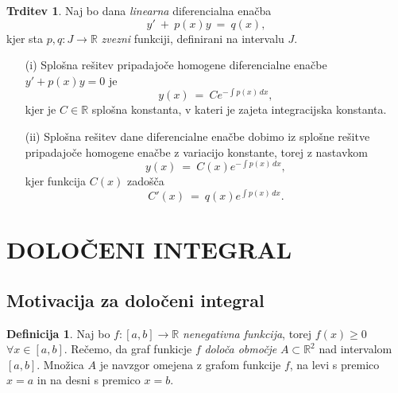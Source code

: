 \documentclass[11pt]{article}
\theoremstyle{definition}
\newtheorem{definicija}{Definicija}[section]
\theoremstyle{definition}
\newtheorem{trditev}{Trditev}[section]
\theoremstyle{definition}
\theoremstyle{theorem}
\begin{document}
\begin{trditev}

Naj bo dana \textit{linearna} diferencialna enačba 
$$y' ~+~ p(x) y ~=~ q(x),$$
kjer sta $p, q: J \rightarrow \mathbb{R}$ \textit{zvezni} funkciji, definirani na intervalu $J$.
\begin{enumerate}

	\item[(i)] Splošna rešitev pripadajoče homogene diferencialne enačbe \\ $y' + p(x) y = 0$ je
	$$y(x) ~=~ Ce^{-\int p(x)\,dx},$$
	kjer je $C \in \mathbb{R}$ splošna konstanta, v kateri je zajeta integracijska konstanta.
	
	\item[(ii)] Splošna rešitev dane diferencialne enačbe dobimo iz splošne rešitve pripadajoče homogene enačbe z variacijo konstante, torej z nastavkom
	$$y(x) ~=~ C(x)e^{-\int p(x)\,dx},$$
	kjer funkcija $C(x)$ zadošča
	$$C'(x) ~=~ q(x)e^{\int p(x)\,dx}.$$

\end{enumerate}

\end{trditev}
\vspace{0.5cm}


\pagebreak


\section{DOLOČENI INTEGRAL}
\vspace{0.5cm}


\subsection{Motivacija za določeni integral}
\vspace{0.5cm}

\begin{definicija}

Naj bo $f:[a, b] \rightarrow \mathbb{R}$ \textit{nenegativna funkcija}, torej \hbox{$f(x) \geq 0$} $\forall x \in [a, b]$. Rečemo, da graf funkicje $f$ \textit{določa območje} $A \subset \mathbb{R}^2$  nad \hbox{intervalom} $[a, b]$. Množica $A$ je navzgor omejena z grafom funkcije $f$, na levi s premico $x=a$ in na desni s premico $x=b$.

\end{definicija}
\vspace{0.5cm}
\end{document}
